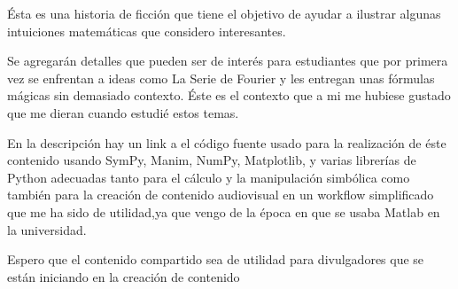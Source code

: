 \documentclass[preview]{standalone}
\begin{document}
\begin{center}
Ésta es una historia de ficción que tiene el objetivo de ayudar a ilustrar algunas intuiciones matemáticas que considero interesantes. 


$$ $$
Se agregarán detalles que pueden ser de interés para estudiantes que por primera vez se enfrentan a ideas como La Serie de Fourier y les entregan unas fórmulas mágicas sin demasiado contexto. Éste es el contexto que a mi me hubiese gustado que me dieran cuando estudié estos temas. 

$$ $$
En la descripción hay un link a el código fuente usado para la realización de éste contenido usando SymPy, Manim, NumPy, Matplotlib, y varias librerías de Python adecuadas tanto para el cálculo y la manipulación simbólica como también para la creación de contenido audiovisual en un workflow simplificado que me ha sido de utilidad,ya que vengo de la época en que se usaba Matlab en la universidad.

$$ $$ 
Espero que el contenido compartido sea de utilidad para  divulgadores que se están iniciando en la creación de contenido
\end{center}
\end{document}
